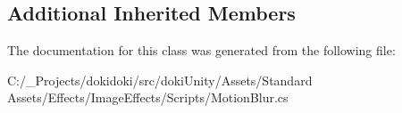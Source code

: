 \subsection*{Additional Inherited Members}


The documentation for this class was generated from the following file\+:\begin{DoxyCompactItemize}
\item 
C\+:/\+\_\+\+Projects/dokidoki/src/doki\+Unity/\+Assets/\+Standard Assets/\+Effects/\+Image\+Effects/\+Scripts/Motion\+Blur.\+cs\end{DoxyCompactItemize}

